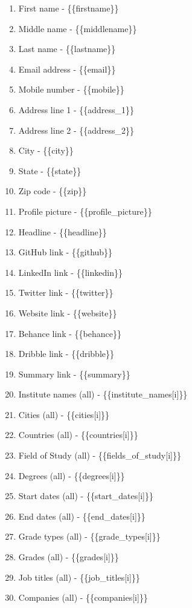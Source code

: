 \begin{enumerate}
\def\labelenumi{\arabic{enumi})}
\itemsep1pt\parskip0pt
\item
  First name - \{\{firstname\}\}
\item
  Middle name - \{\{middlename\}\}
\item
  Last name - \{\{lastname\}\}
\item
  Email address - \{\{email\}\}
\item
  Mobile number - \{\{mobile\}\}
\item
  Address line 1 - \{\{address\_1\}\}
\item
  Address line 2 - \{\{address\_2\}\}
\item
  City - \{\{city\}\}
\item
  State - \{\{state\}\}
\item
  Zip code - \{\{zip\}\}
\item
  Profile picture - \{\{profile\_picture\}\}
\item
  Headline - \{\{headline\}\}
\item
  GitHub link - \{\{github\}\}
\item
  LinkedIn link - \{\{linkedin\}\}
\item
  Twitter link - \{\{twitter\}\}
\item
  Website link - \{\{website\}\}
\item
  Behance link - \{\{behance\}\}
\item
  Dribble link - \{\{dribble\}\}
\item
  Summary link - \{\{summary\}\}
\item
  Institute names (all) - \{\{institute\_names{[}i{]}\}\}
\item
  Cities (all) - \{\{cities{[}i{]}\}\}
\item
  Countries (all) - \{\{countries{[}i{]}\}\}
\item
  Field of Study (all) - \{\{fields\_of\_study{[}i{]}\}\}
\item
  Degrees (all) - \{\{degrees{[}i{]}\}\}
\item
  Start dates (all) - \{\{start\_dates{[}i{]}\}\}
\item
  End dates (all) - \{\{end\_dates{[}i{]}\}\}
\item
  Grade types (all) - \{\{grade\_types{[}i{]}\}\}
\item
  Grades (all) - \{\{grades{[}i{]}\}\}
\item
  Job titles (all) - \{\{job\_titles{[}i{]}\}\}
\item
  Companies (all) - \{\{companies{[}i{]}\}\}

\end{enumerate}
